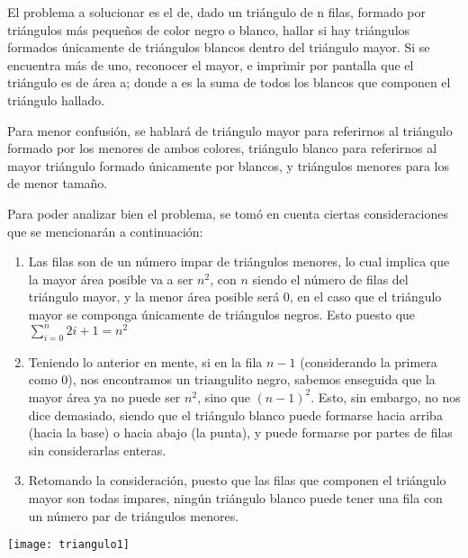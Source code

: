 \documentclass[spanish]{article}
\begin{document}
  \par
  El problema a solucionar es el de, dado un triángulo de n filas,
  formado por triángulos más pequeños de color negro o blanco, hallar si hay
  triángulos formados únicamente de triángulos blancos dentro del triángulo
  mayor. Si se encuentra más de uno, reconocer el mayor, e imprimir por pantalla
  que el triángulo es de área a; donde a es la suma de todos los blancos que
  componen el triángulo hallado.\par
  Para menor confusión, se hablará de triángulo mayor para
  referirnos al triángulo formado por los menores de ambos colores, triángulo
  blanco para referirnos al mayor triángulo formado únicamente por blancos, y
  triángulos menores para los de menor tamaño.\par
  Para poder analizar bien el problema, se tomó en cuenta ciertas
  consideraciones que se mencionarán a continuación:
    \begin{enumerate}
    \item Las filas son de un número impar de triángulos menores,
    lo cual implica que la mayor área posible va a ser \(n^2\), con \(n\) siendo el
    número de filas del triángulo mayor, y la menor área posible será 0,
    en el caso que el triángulo mayor se componga únicamente de triángulos
    negros. Esto puesto que $\sum_{i=0}^{n} 2{i}+1 = {n}^2$
    \item Teniendo lo anterior en mente, si en la fila \(n-1\) (considerando la
    primera como 0), nos encontramos un triangulito negro, sabemos enseguida
    que la mayor área ya no puede ser \({n}^2\), sino que \({(n-1)}^2\). Esto, sin embargo,
    no nos dice demasiado, siendo que el triángulo blanco puede formarse hacia
    arriba (hacia la base) o hacia abajo (la punta), y puede formarse por
    partes de filas sin considerarlas enteras.
    \item Retomando la consideración, puesto que las filas que componen el
    triángulo mayor son todas impares, ningún triángulo blanco puede tener
    una fila con un número par de triángulos menores.


    \end{enumerate}

  \begin{center}
  \texttt{[image: triangulo1]}
  \end{center}
\end{document}
